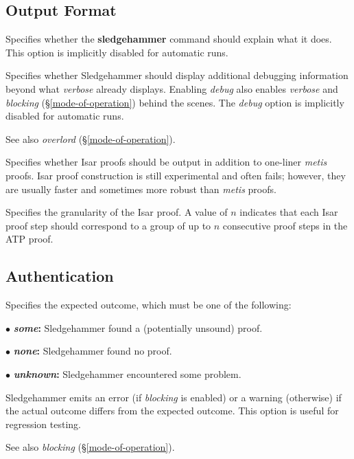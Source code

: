 \documentclass[a4paper,12pt]{article}
\begin{document}
\subsection{Output Format}
\label{output-format}

\begin{enum}

Specifies whether the \textbf{sledgehammer} command should explain what it does.
This option is implicitly disabled for automatic runs.

Specifies whether Sledgehammer should display additional debugging information
beyond what \textit{verbose} already displays. Enabling \textit{debug} also
enables \textit{verbose} and \textit{blocking} (\S\ref{mode-of-operation})
behind the scenes. The \textit{debug} option is implicitly disabled for
automatic runs.

\nopagebreak
{\small See also \textit{overlord} (\S\ref{mode-of-operation}).}

Specifies whether Isar proofs should be output in addition to one-liner
\textit{metis} proofs. Isar proof construction is still experimental and often
fails; however, they are usually faster and sometimes more robust than
\textit{metis} proofs.

Specifies the granularity of the Isar proof. A value of $n$ indicates that each
Isar proof step should correspond to a group of up to $n$ consecutive proof
steps in the ATP proof.

\end{enum}

\subsection{Authentication}
\label{authentication}

\begin{enum}
Specifies the expected outcome, which must be one of the following:

\begin{enum}
\item[$\bullet$] \textbf{\textit{some}:} Sledgehammer found a (potentially
unsound) proof.
\item[$\bullet$] \textbf{\textit{none}:} Sledgehammer found no proof.
\item[$\bullet$] \textbf{\textit{unknown}:} Sledgehammer encountered some
problem.
\end{enum}

Sledgehammer emits an error (if \textit{blocking} is enabled) or a warning
(otherwise) if the actual outcome differs from the expected outcome. This option
is useful for regression testing.

\nopagebreak
{\small See also \textit{blocking} (\S\ref{mode-of-operation}).}
\end{enum}

\let\em=\sl
{}

\end{document}
